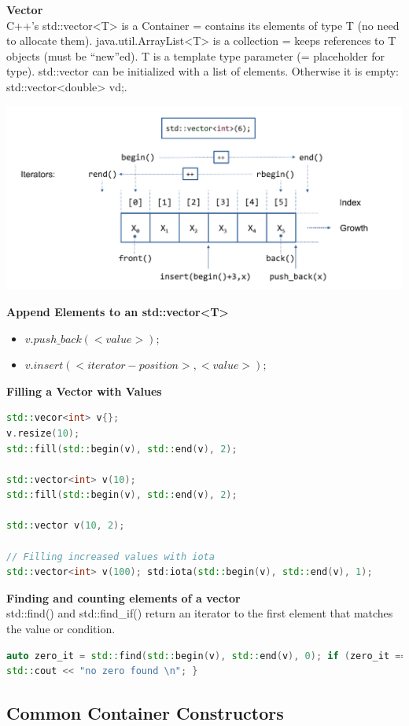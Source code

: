 \textbf{Vector}\\
C++'s std::vector<T> is a Container = contains its elements of type T (no need to allocate them). java.util.ArrayList<T> is a collection = keeps references to T objects (must be “new”ed).  T is a template type parameter (= placeholder for type). std::vector can be initialized with a list of elements. Otherwise it is empty: std::vector<double> vd{};.
\begin{center}
\includegraphics[width=0.75\linewidth]{images/vector}
\end{center}
\textbf{Append Elements to an std::vector<T>}
\begin{itemize}
  \itemsep -0.5em 
  \item $v.push\_back(<value>);$
  \item $v.insert (<iterator-position>, <value>);$
\end{itemize}

\textbf{Filling a Vector with Values}
\begin{lstlisting}[language=C++]
std::vecor<int> v{};
v.resize(10);
std::fill(std::begin(v), std::end(v), 2);

std::vector<int> v(10); 
std::fill(std::begin(v), std::end(v), 2);

std::vector v(10, 2);

// Filling increased values with iota
std::vector<int> v(100); std:iota(std::begin(v), std::end(v), 1);
\end{lstlisting}

\textbf{Finding and counting elements of a vector} \\
 std::find() and std::find\_if() return an iterator to the first element that matches the value or condition.
\begin{lstlisting}[language=C++]
auto zero_it = std::find(std::begin(v), std::end(v), 0); if (zero_it == std::end(v)) {
std::cout << "no zero found \n"; }
\end{lstlisting}

\subsection{Common Container Constructors}

